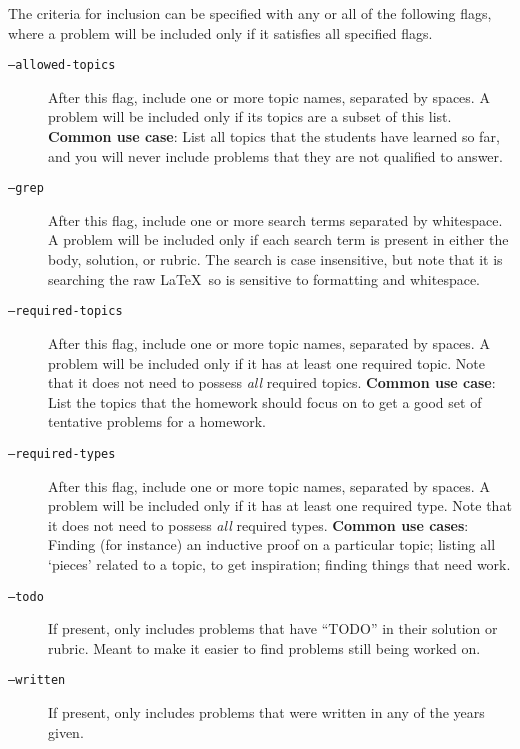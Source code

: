     The criteria for inclusion can be specified with any or all of the following flags, where a problem will be included only if it satisfies all specified flags.
    \begin{description}
      \item[\texttt{--allowed-topics}] After this flag, include one or more topic names, separated by spaces. A problem will be included only if its topics are a subset of this list. \textbf{Common use case}: List all topics that the students have learned so far, and you will never include problems that they are not qualified to answer.
      \item[\texttt{--grep}] After this flag, include one or more search terms separated by whitespace. A problem will be included only if each search term is present in either the body, solution, or rubric. The search is case insensitive, but note that it is searching the raw \LaTeX\ so is sensitive to formatting and whitespace.
      \item[\texttt{--required-topics}] After this flag, include one or more topic names, separated by spaces. A problem will be included only if it has at least one required topic. Note that it does not need to possess \textit{all} required topics. \textbf{Common use case}: List the topics that the homework should focus on to get a good set of tentative problems for a homework.
      \item[\texttt{--required-types}] After this flag, include one or more topic names, separated by spaces. A problem will be included only if it has at least one required type. Note that it does not need to possess \textit{all} required types. \textbf{Common use cases}: Finding (for instance) an inductive proof on a particular topic; listing all `pieces' related to a topic, to get inspiration; finding things that need work.
      \item[\texttt{--todo}] If present, only includes problems that have ``TODO'' in their solution or rubric. Meant to make it easier to find problems still being worked on.
      \item[\texttt{--written}] If present, only includes problems that were written in any of the years given.
    \end{description}